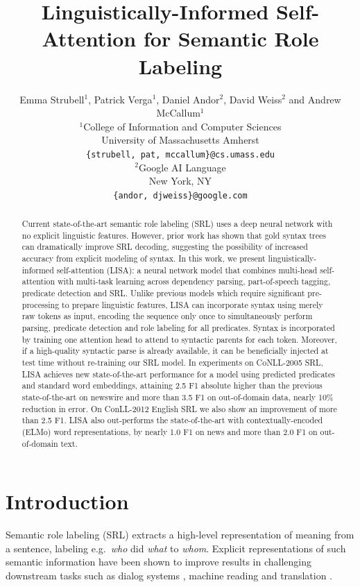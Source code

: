 \documentclass[11pt,a4paper]{article}
\title{Linguistically-Informed Self-Attention for Semantic Role Labeling}
\author{Emma Strubell$^1$, Patrick Verga$^1$, Daniel Andor$^2$, David Weiss$^2$ and Andrew McCallum$^1$ \\
  $^1$College of Information and Computer Sciences \\
    University of Massachusetts Amherst \\
    {\tt \{strubell, pat, mccallum\}@cs.umass.edu} \\
  $^2$Google AI Language \\
  New York, NY \\
  {\tt\{andor, djweiss\}@google.com}}
\date{}
\begin{document}
\maketitle
\begin{abstract}
Current state-of-the-art semantic role labeling (SRL) uses a deep neural network with no explicit linguistic features. 
However, prior work has shown that gold syntax trees can dramatically improve SRL decoding, suggesting the possibility of increased accuracy from explicit modeling of syntax.
In this work, we present linguistically-informed self-attention (LISA): a neural network model that combines multi-head self-attention with multi-task learning across dependency parsing, part-of-speech tagging, predicate detection and SRL.  Unlike previous models which require significant pre-processing to prepare linguistic features, LISA can incorporate syntax using merely raw tokens as input, encoding the sequence only once to simultaneously perform parsing, predicate detection and role labeling for all predicates. Syntax is incorporated by training one attention head to attend to syntactic parents for each token. Moreover, if a high-quality syntactic parse is already available, it can be beneficially injected at test time without re-training our SRL model.
In experiments on CoNLL-2005 SRL, LISA achieves new state-of-the-art performance for a model using predicted predicates and standard word embeddings, attaining 2.5 F1 absolute higher than the previous state-of-the-art on newswire and more than 3.5 F1 on out-of-domain data, nearly 10\% reduction in error. On ConLL-2012 English SRL we also show an improvement of more than 2.5 F1. LISA also out-performs the state-of-the-art with contextually-encoded (ELMo) word representations, by nearly 1.0 F1 on news and more than 2.0 F1 on out-of-domain text.
\end{abstract}

\section{Introduction}
Semantic role labeling (SRL) extracts a high-level representation of meaning from a sentence, labeling e.g.\ \emph{who} did \emph{what} to \emph{whom}. Explicit representations of such semantic information have been shown to improve results in challenging downstream tasks such as dialog systems \citep{tur2005semi,chen2013unsupervised}, machine reading \citep{berant2014modeling, wang2015machine} and translation \citep{liu2010semantic,bazrafshan2013semantic}. 
\end{document}
